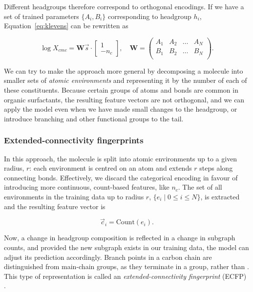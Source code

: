 Different headgroups therefore correspond to orthogonal encodings. If we have a
set of trained parameters $\{A_i, B_i\}$ corresponding to headgroup $h_i$,
Equation~\ref{eq:klevens} can be rewritten as

\begin{equation}
    \log X_{cmc} = \mathbf{W}\vec{s} \cdot \begin{bmatrix}
        1 \\ -n_c
    \end{bmatrix},\quad \mathbf{W} = \begin{pmatrix}
        A_1 & A_2 & \dots  & A_N\\
        B_1 & B_2 & \dots & B_N\\
    \end{pmatrix}.
\end{equation}

We can try to make the approach more general by decomposing a molecule into
smaller sets of \emph{atomic environments} and representing it by the number of
each of these constituents. Because certain groups of atoms and bonds are common
in organic surfactants, the resulting feature vectors are not orthogonal, and we
can apply the model even when we have made small changes to the headgroup, or
introduce branching and other functional groups to the tail.

\subsubsection{Extended-connectivity fingerprints}

In this approach, the molecule is split into atomic environments up to a given
radius, $r$: each environment is centred on an atom and extends $r$ steps along
connecting bonds. Effectively, we discard the categorical encoding in favour of
introducing more continuous, count-based features, like $n_c$. The set of all
environments in the training data up to radius $r$, $\{e_i \mid 0 \leq i \leq
N\}$, is extracted and the resulting feature vector is

\begin{equation}
    \label{eq:ecfp}
    \vec{c}_i = \text{Count}(e_i).
\end{equation}

Now, a change in headgroup composition is reflected in a change in subgraph
counts, and provided the new subgraph exists in our training data, the model can
adjust its prediction accordingly. Branch points in a carbon chain are
distinguished from main-chain groups, as they terminate in a  group,
rather than . This type of representation is called an
\emph{extended-connectivity fingerprint} (ECFP)
\cite{rogersExtendedConnectivityFingerprints2010}.

